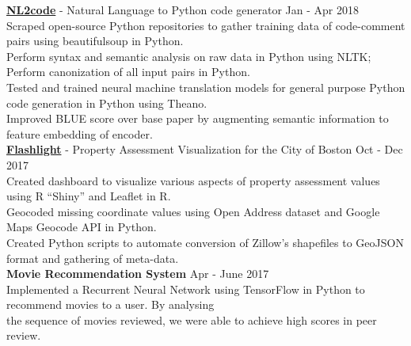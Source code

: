 \documentclass[a4paper]{article}
\newcommand{\myline}{\par
  \kern2pt %
  \hrule height 0.5pt
  \kern2pt %
}
\newcommand{\mybullet}{
	\indent \textbullet \hspace*{2mm}
}
\begin{document}
			\noindent
      \textbf{\href{https://github.com/DarkestFloyd/NL2code}{NL2code}} - Natural Language to 
      Python code generator \hfill Jan - Apr 2018 \\
      \mybullet Scraped open-source Python repositories to gather training data of 
      code-comment pairs using beautifulsoup in Python. \\
      \mybullet Perform syntax and semantic analysis on raw data in Python using NLTK; Perform canonization of all input pairs in Python. \\
      \mybullet Tested and trained neural machine translation models for general purpose Python 
      code generation in Python using Theano. \\
      \mybullet Improved BLUE score over base paper by augmenting semantic information to 
      feature embedding of encoder. \\

			\noindent
      \textbf{\href{https://sichenghao1992.shinyapps.io/DS5110/}{Flashlight}} - Property 
			Assessment Visualization for the City of Boston \hfill Oct - Dec 2017 \\
      \mybullet Created dashboard to visualize various aspects of property assessment values 
      using R ``Shiny'' and Leaflet in R. \\
      \mybullet Geocoded missing coordinate values using Open Address dataset and Google Maps Geocode API in Python. \\
      \mybullet Created Python scripts to automate conversion of Zillow's shapefiles to GeoJSON format and gathering of meta-data. \\ 
			
			\noindent
			\textbf{Movie Recommendation System} \hfill Apr - June 2017\\
			\mybullet Implemented a Recurrent Neural Network using TensorFlow in Python to recommend 
      movies to a user. By analysing \\ \hspace*{9mm} the sequence of movies reviewed, we were 
      able to achieve high scores in peer review. \\ 

	
		
\end{document}
